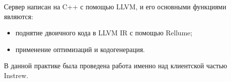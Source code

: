 Сервер написан на C++ с помощью LLVM, и его основными функциями являются:
\begin{itemize}
    \item поднятие двоичного кода в LLVM IR с помощью Rellume;
    \item применение оптимизаций и кодогенерация.
\end{itemize}

В данной практике была проведена работа именно над клиентской частью Instrew.


